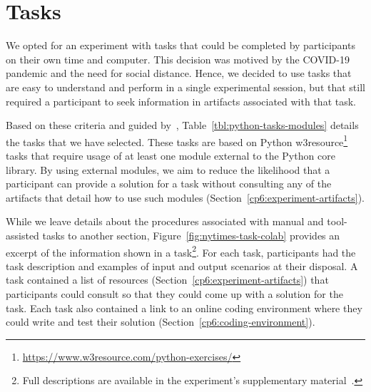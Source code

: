 
\section{Tasks}
\label{cp6:tasks}



We opted for an experiment with tasks that could be completed by participants on their own time and computer.
This decision was motived by the COVID-19 pandemic and the need for social distance\red{~\cite{}}. 
Hence, we decided to use tasks that are easy to understand and perform in a single experimental session, but that still required a participant  
to seek information in artifacts associated with that task.

% 


Based on these criteria and guided by~\cite{thiselton2019},
Table~\ref{tbl:python-tasks-modules} details the tasks that we have selected. 
These tasks are based on 
Python w3resource\footnote{\url{https://www.w3resource.com/python-exercises/}} tasks
that require usage of at least one module external to the Python core library.
By using external modules, we aim to reduce the likelihood that a participant 
can provide a solution for a task without consulting any of the artifacts
that detail how to use such modules (Section~\ref{cp6:experiment-artifacts}). 











While we leave details about the procedures associated with manual and tool-assisted tasks to another section, Figure~\ref{fig:nytimes-task-colab} provides an excerpt of the information shown in a task\footnote{Full descriptions are available in the experiment's supplementary material~\red{\cite{}}.}.
For each task, participants had the task description and examples of input and output scenarios at their disposal. A task contained a list of resources (Section~\ref{cp6:experiment-artifacts}) that participants could consult 
so that they could come up with a solution for the task.
Each task also contained a link to an online coding environment
where they could write and test their solution (Section~\ref{cp6:coding-environment}). 




